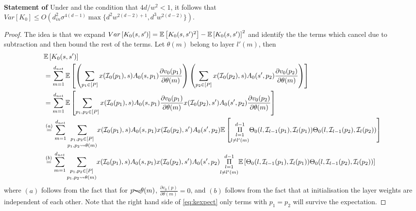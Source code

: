 \textbf{Statement of }
Under  and the condition that ${4d}/{w^2}<1$, it follows that\hfill\\
$Var\left[K_0\right]\leq O\left(d^2_{in}\sigma^{4(d-1)}\max\{d^2w^{2(d-2)+1}, d^3w^{2(d-2)}\}\right)$.
\begin{proof}
The idea is that we expand  $Var\left[K_0(s,s')\right]=\mathbb{E}\left[K_0(s,s')^2\right] -\mathbb{E}\left[K_0(s,s')\right]^2$ and identify the the terms which cancel due to subtraction and then bound the rest of the terms.%
 Let $\theta(m)$ belong to layer $l'(m)$, then 
\begin{align}\label{eq:kexpect}
&\mathbb{E}\left[K_0(s,s')\right]\nonumber\\
&=\sum_{m=1}^{d_{net}}\mathbb{E}\left[\left(\sum_{p_1 \in[P]}x(\mathcal{I}_0(p_1),s)A_0(s,p_1)\frac{\partial v_0(p_1)}{\partial \theta(m)}\right)\left(\sum_{p_2\in[P]}x(\mathcal{I}_0(p_2),s)A_0(s',p_2)\frac{\partial v_0(p_2)}{\partial \theta(m)}\right)\right]\nonumber\\
&=\sum_{m=1}^{d_{net}}\mathbb{E}\left[\sum_{p_1,p_2\in[P]}x(\mathcal{I}_0(p_1),s)A_0(s,p_1)\frac{\partial v_0(p_1)}{\partial \theta(m)}x(\mathcal{I}_0(p_2),s')A_0(s',p_2)\frac{\partial v_0(p_2)}{\partial \theta(m)}\right]\nonumber\\
&\stackrel{(a)}=\sum_{m=1}^{d_{net}}\underset{p_1,p_2\rightsquigarrow\theta(m)}{\sum_{p_1,p_2\in[P]}}x(\mathcal{I}_0(p_1),s)A_0(s,p_1)x(\mathcal{I}_0(p_2),s')A_0(s',p_2) \mathbb{E}\left[\underset{l\neq l'(m)}{\underset{l=1}{\overset{d-1}{\Pi}}} {\Theta}_0(l,\mathcal{I}_{l-1}(p_1),\mathcal{I}_{l}(p_1)) {\Theta}_0(l,\mathcal{I}_{l-1}(p_2),\mathcal{I}_{l}(p_2))\right]\nonumber\\
&\stackrel{(b)}=\sum_{m=1}^{d_{net}}\underset{p_1,p_2\rightsquigarrow\theta(m)}{\sum_{p_1,p_2\in[P]}}x(\mathcal{I}_0(p_1),s)A_0(s,p_1)x(\mathcal{I}_0(p_2),s')A_0(s',p_2) \underset{l\neq l'(m)}{\underset{l=1}{\overset{d-1}{\Pi}}} \mathbb{E}\left[{\Theta}_0(l,\mathcal{I}_{l-1}(p_1),\mathcal{I}_{l}(p_1)) {\Theta}_0(l,\mathcal{I}_{l-1}(p_2),\mathcal{I}_{l}(p_2))\right]
\end{align}
where $(a)$ follows from the fact that for $p\bcancel{\rightsquigarrow}\theta(m)$, $\frac{\partial v_0(p)}{\partial \theta(m)}=0$, and $(b)$ follows from the fact that at initialisation the layer weights are independent of each other. Note that the right hand side of \eqref{eq:kexpect} only terms with $p_1=p_2$ will survive the expectation.


\end{proof}
